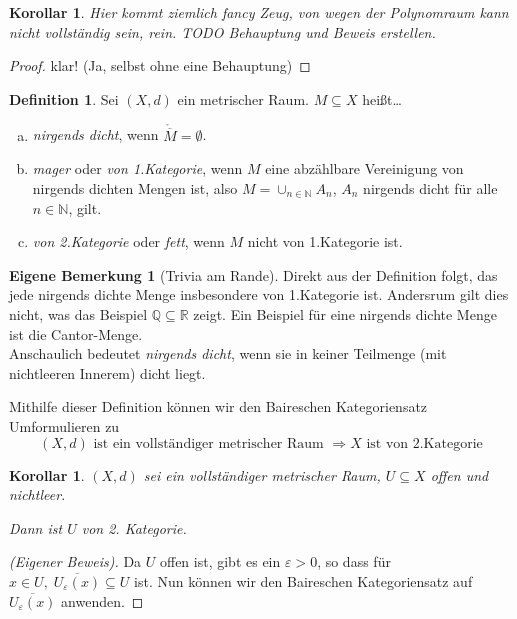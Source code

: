 \documentclass[ngerman]{report}
\theoremstyle{plain}%
\newtheorem{cor}[thm]{Korollar}
\newtheorem*{cor*}{Korollar}
\theoremstyle{definition}%
\newtheorem{definition}[thm]{Definition}
\theoremstyle{myStyle}
\newtheorem*{mbem*}{Eigene Bemerkung}
\newcommand{\R}{\mathbb{R}}
\newcommand{\Q}{\mathbb{Q}}
\newcommand{\N}{\mathbb{N}}
\newcommand{\df}[1][]{%
	\overset{#1}{\Rightarrow}
}
\newcommand{\qmarks}[1]{#1}
\begin{document}
	\begin{cor*}
		Hier kommt ziemlich fancy Zeug, von wegen der Polynomraum kann nicht vollständig sein, rein. TODO Behauptung und Beweis erstellen.
	\end{cor*}
	\begin{proof}
		klar! (Ja, selbst ohne eine Behauptung)
	\end{proof}

\begin{definition}
	Sei $(X,d)$ ein metrischer Raum. $M\subseteq X$ heißt\dots
	\begin{enumerate}[(a)]
		\item \textit{nirgends dicht}, wenn $\mathring{\overline{M}} = \emptyset$.
		
		\item \textit{mager} oder \textit{von 1.Kategorie}, wenn $M$ eine abzählbare Vereinigung von nirgends dichten Mengen ist, also $M = \cup_{n\in\N} A_n$, $A_n$ nirgends dicht für alle $n\in\N$, gilt.
		
		\item \textit{von 2.Kategorie }oder\textit{ fett}, wenn $M$ nicht von 1.Kategorie ist.
	\end{enumerate}
\end{definition}\par\bigskip

\begin{mbem*}[Trivia am Rande] Direkt aus der Definition folgt, das jede nirgends dichte Menge insbesondere von 1.Kategorie ist. Andersrum gilt dies nicht, was das Beispiel $\Q\subseteq \R$ zeigt. Ein Beispiel für eine nirgends dichte Menge ist die Cantor-Menge.\\
	 \qmarks{Anschaulich} bedeutet \textit{nirgends dicht}, wenn sie in keiner Teilmenge (mit nichtleeren Innerem) dicht liegt. \par\bigskip
\end{mbem*}
	Mithilfe dieser Definition können wir den Baireschen Kategoriensatz Umformulieren zu $$(X,d) \text{ ist ein vollständiger metrischer Raum } \df X \text{ ist von 2.Kategorie}$$ 

\begin{cor}
	$(X,d)$ sei ein vollständiger metrischer Raum, $U\subseteq X$ offen und nichtleer.\par
	Dann ist $U$ von 2. Kategorie.
\end{cor} 
\begin{proof}[(Eigener Beweis)]%
	Da $U$ offen ist, gibt es ein $\varepsilon>0$, so dass für $x\in U,\;\overline{U_\varepsilon(x)}\subseteq U$ ist. Nun können wir den Baireschen Kategoriensatz auf $\overline{U_\varepsilon(x)}$ anwenden.
\end{proof}
\end{document}
